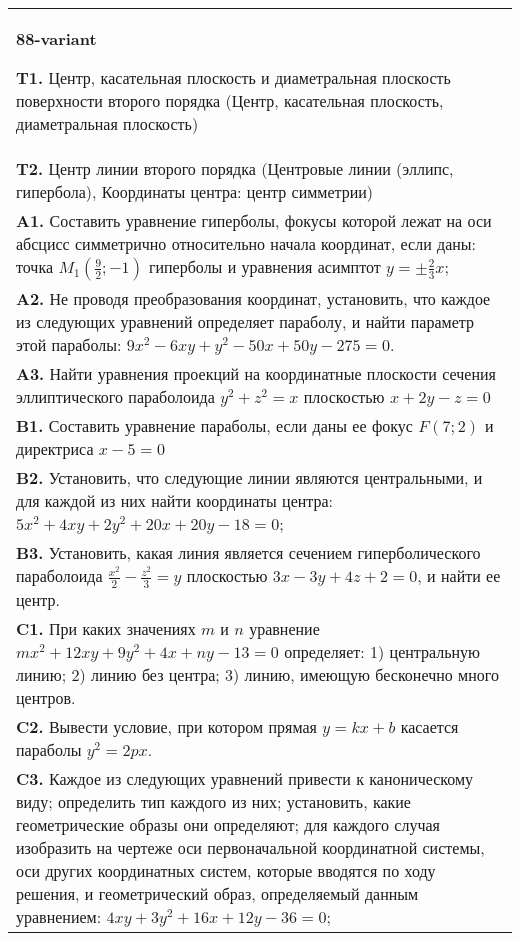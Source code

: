 \documentclass{article}
\begin{document}
\begin{tabular}{m{17cm}}
\textbf{88-variant}
\newline

\textbf{T1.} Центр, касательная плоскость и диаметральная плоскость поверхности второго порядка (Центр, касательная плоскость, диаметральная плоскость) \\
\textbf{T2.} Центр линии второго порядка (Центровые линии (эллипс, гипербола), Координаты центра: центр симметрии) \\
\textbf{A1.} Составить уравнение гиперболы, фокусы которой лежат на оси абсцисс симметрично относительно начала координат, если даны: точка $M_1\left(\frac{9}{2} ;-1\right)$ гиперболы и уравнения асимптот $y= \pm \frac{2}{3} x$; \\
\textbf{A2.} Не проводя преобразования координат, установить, что каждое из следующих уравнений определяет параболу, и найти параметр этой параболы: $9 x^2-6 x y+y^2-50 x+50 y-275=0$. \\
\textbf{A3.} Найти уравнения проекций на координатные плоскости сечения эллиптического параболоида $y^2+z^2=x$ плоскостью $x+2 y-z=0$ \\
\textbf{B1.} Составить уравнение параболы, если даны ее фокус $F(7 ; 2)$ и директриса $x-5=0$ \\
\textbf{B2.} Установить, что следующие линии являются центральными, и для каждой из них найти координаты центра: $5 x^2+4 x y+2 y^2+20 x+20 y-18=0$; \\
\textbf{B3.} Установить, какая линия является сечением гиперболического параболоида $\frac{x^2}{2}-\frac{z^2}{3}=y$ плоскостью $3 x-3 y+4 z+2=0$, и найти ее центр. \\
\textbf{C1.} При каких значениях $m$ и $n$ уравнение $m x^2+12 x y+9 y^2+4 x+n y-13=0$ определяет: 1) центральную линию; 2) линию без центра; 3) линию, имеющую бесконечно много центров. \\
\textbf{C2.} Вывести условие, при котором прямая $y=k x+b$ касается параболы $y^2=2 p x$. \\
\textbf{C3.} Каждое из следующих уравнений привести к каноническому виду; определить тип каждого из них; установить, какие геометрические образы они определяют; для каждого случая изобразить на чертеже оси первоначальной координатной системы, оси других координатных систем, которые вводятся по ходу решения, и геометрический образ, определяемый данным уравнением: $4 x y+3 y^2+16 x+12 y-36=0$; \\

\end{tabular}
\vspace{1cm}
\end{document}

